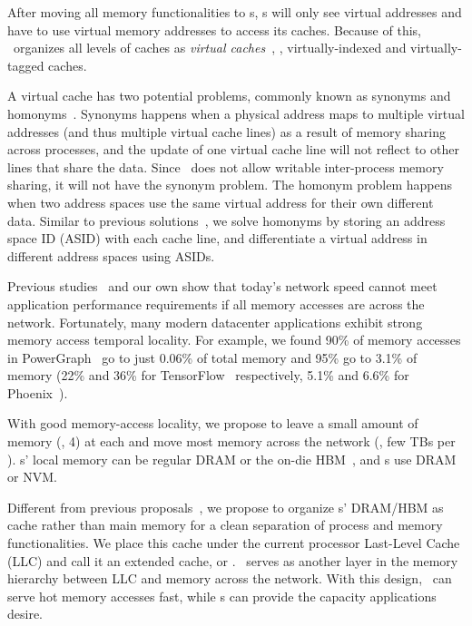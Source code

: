 After moving all memory functionalities to \mcomponent{}s,  
\pcomponent{}s will only see virtual addresses and have to use virtual memory addresses to access its caches. 
Because of this, \lego\ organizes all levels of \pcomponent{} caches as {\em virtual caches}~\cite{Goodman-ASPLOS87,Wang-ISCA89},
\ie, virtually-indexed and virtually-tagged caches.

A virtual cache has two potential problems, commonly known as synonyms and homonyms~\cite{CacheMemory82}.
Synonyms happens when a physical address maps to multiple virtual addresses (and thus multiple virtual cache lines) 
as a result of memory sharing across processes,
and the update of one virtual cache line will not reflect to other lines that share the data.
Since \lego\ does not allow writable inter-process memory sharing,
it will not have the synonym problem.
The homonym problem happens when two address spaces use the same virtual address for their own different data.
Similar to previous solutions~\cite{OVC}, we solve homonyms by storing an address space ID (ASID) with each cache line,
and differentiate a virtual address in different address spaces using ASIDs.

Previous studies~\cite{Gao16-OSDI,GU17-NSDI} and our own show that today's network speed 
cannot meet application performance requirements if all memory accesses are across the network. 
Fortunately, many modern datacenter applications exhibit strong memory access temporal locality.
For example, we found 90\% of memory accesses in PowerGraph~\cite{Gonzalez12-OSDI} go to just 0.06\% of total memory
and 95\% go to 3.1\% of memory
(22\% and 36\% for TensorFlow~\cite{TensorFlow} respectively,
5.1\% and 6.6\% for Phoenix~\cite{Ranger07-HPCA}).

With good memory-access locality, we propose to %
leave a small amount of memory (\eg, 4\GB) at each \pcomponent{}
and move most memory across the network (\eg, few TBs per \mcomponent{}).
\pcomponent{}s' local memory can be regular DRAM 
or the on-die HBM~\cite{HBM-JEDEC,Knights-Landing},
and \mcomponent{}s use DRAM or NVM.

Different from previous proposals~\cite{Lim09-disaggregate}, 
we propose to organize \pcomponent{}s' DRAM/HBM as cache rather than main memory
for a clean separation of process and memory functionalities.
We place this cache under the current processor Last-Level Cache (LLC)
and call it an extended cache, or {\em \excache}.
\excache\ serves as another layer in the memory hierarchy between LLC and memory across the network.
With this design, \excache\ can serve hot memory accesses fast, while \mcomponent{}s can provide the capacity applications desire. 


